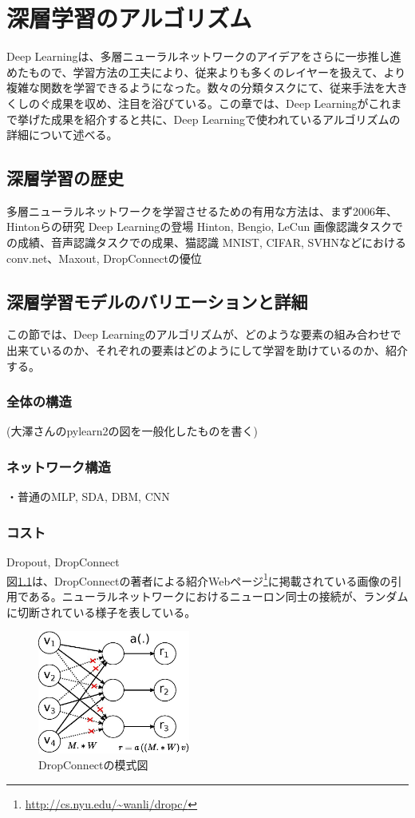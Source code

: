 \chapter{深層学習のアルゴリズム}
Deep Learningは、多層ニューラルネットワークのアイデアをさらに一歩推し進めたもので、学習方法の工夫により、従来よりも多くのレイヤーを扱えて、より複雑な関数を学習できるようになった。数々の分類タスクにて、従来手法を大きくしのぐ成果を収め、注目を浴びている。この章では、Deep Learningがこれまで挙げた成果を紹介すると共に、Deep Learningで使われているアルゴリズムの詳細について述べる。

\section{深層学習の歴史}
多層ニューラルネットワークを学習させるための有用な方法は、まず2006年、Hintonらの研究
Deep Learningの登場 Hinton, Bengio, LeCun
画像認識タスクでの成績、音声認識タスクでの成果、猫認識
MNIST, CIFAR, SVHNなどにおけるconv.net、Maxout, DropConnectの優位

\section{深層学習モデルのバリエーションと詳細}
この節では、Deep Learningのアルゴリズムが、どのような要素の組み合わせで出来ているのか、それぞれの要素はどのようにして学習を助けているのか、紹介する。
\subsection{全体の構造}
(大澤さんのpylearn2の図を一般化したものを書く)
\subsection{ネットワーク構造}
・普通のMLP, SDA, DBM, CNN
\subsection{コスト}
Dropout, DropConnect \\
図\ref{c3_dropconnect}は、DropConnectの著者による紹介Webページ\footnote{\url{http://cs.nyu.edu/~wanli/dropc/}}に掲載されている画像の引用である。ニューラルネットワークにおけるニューロン同士の接続が、ランダムに切断されている様子を表している。
\begin{figure}[tbp]
 \begin{center}
  \includegraphics[width=50mm]{img/c3/nn_dc}
 \end{center}
 \caption{DropConnectの模式図}
 \label{c3_dropconnect}
\end{figure}
